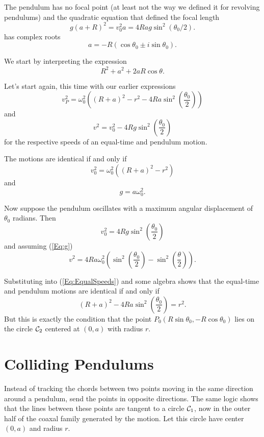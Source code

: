 \documentclass{ximera}
\begin{document}
The pendulum has no focal point (at least not the way we defined it for revolving pendulums) and the quadratic equation that defined the focal length 
\[
     g(a+R)^2 = v_0^2 a = 4Rag\sin^2 (\theta_0/2) .
\]
has complex roots
\[
     a = -R(\cos \theta_0 \pm i \sin \theta_0).
\]

We start by interpreting the expression
\[
       R^2 + a^2 + 2aR\cos\theta.
\]


Let's start again, this time with our earlier expressions
\[
       v_P^2 = \omega_0^2 \left(   (R+a)^2 - r^2 - 4Ra\sin^2 \left( \frac{\theta_0}{2}  \right)      \right)
\]
and
\[
    v^2 = v_0^2 - 4Rg\sin^2 \left( \frac{\theta_0}{2} \right) 
\]
for the respective speeds of an equal-time and pendulum motion.

The motions are identical if and only if
\begin{equation}
       v_0^2 = \omega_0^2 ((R+a)^2 - r^2)  \label{Eq:EqualSpeeds}
\end{equation}
and
\begin{equation}
    g = a\omega_0^2.  \label{Eq:g}
\end{equation}

Now suppose the pendulum oscillates with a maximum angular displacement of $\theta_0$ radians. Then
\[
    v_0^2 = 4Rg \sin^2 \left( \frac{\theta_0}{2} \right) 
\]
and assuming (\ref{Eq:g})
\[
    v^2 = 4Ra\omega_0^2 \left( \sin^2 \left( \frac{\theta_0}{2} \right) -  \sin^2 \left( \frac{\theta}{2}\right)  \right) .
\]

Substituting into (\ref{Eq:EqualSpeeds}) and some algebra shows that the equal-time and pendulum motions are identical if and only if
\[
     (R+a)^2 - 4Ra \sin^2 \left(  \frac{\theta_0}{2}    \right) = r^2 .
\]
But this is exactly the condition that the point $P_0(R \sin\theta_0 ,  -R\cos\theta_0)$ lies on the circle ${\cal C}_2$ centered at $(0,a)$ with radius $r$.




\section*{Colliding Pendulums}
Instead of tracking the chords between two points moving in the same direction around a pendulum, send the points in opposite directions. The same logic shows that the lines between these points are tangent to a circle ${\cal C}_1$, now  in the outer half of the coaxal family generated by the motion. Let this circle have center $(0,a)$ and radius $r$.
\end{document}
